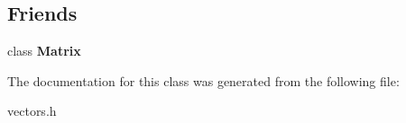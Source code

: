 \subsection*{\-Friends}
\begin{DoxyCompactItemize}
\item 
\hypertarget{classVec4f_a34913a9261681f734171a6da06bd56fe}{class {\bfseries \-Matrix}}\label{classVec4f_a34913a9261681f734171a6da06bd56fe}

\end{DoxyCompactItemize}


\-The documentation for this class was generated from the following file\-:\begin{DoxyCompactItemize}
\item 
vectors.\-h\end{DoxyCompactItemize}
